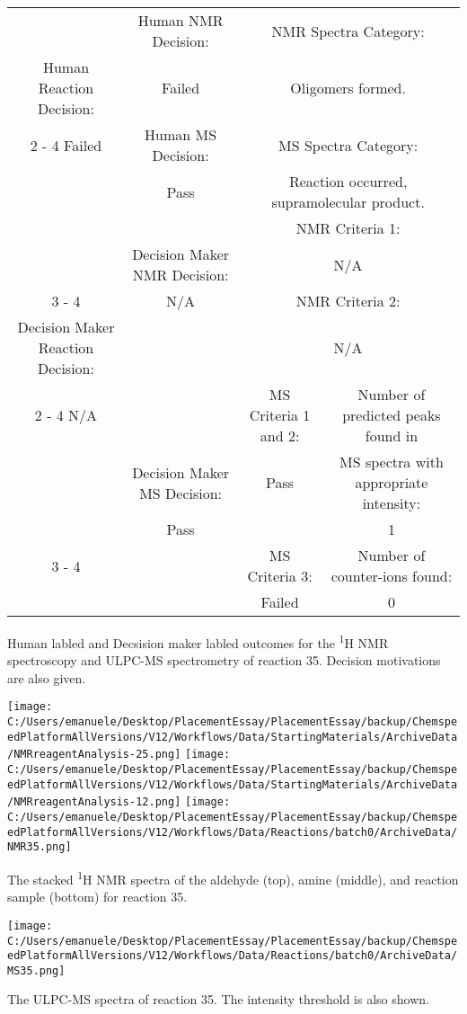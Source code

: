 \documentclass{article}%
\begin{document}
\begin{Decision Table}[H]%
\begin{tabular}{|c|c|c|c|}%
\hline%
&Human NMR Decision:&\multicolumn{2}{|c|}{NMR Spectra Category:}\\%
Human Reaction Decision:&Failed&\multicolumn{2}{|c|}{Oligomers formed.}\\%
\cline{2%
-%
4}%
Failed&Human MS Decision:&\multicolumn{2}{|c|}{MS Spectra Category:}\\%
&Pass&\multicolumn{2}{|c|}{Reaction occurred, supramolecular product.}\\%
\hline%
&&\multicolumn{2}{|c|}{NMR Criteria 1:}\\%
&Decision Maker NMR Decision:&\multicolumn{2}{|c|}{N/A}\\%
\cline{3%
-%
4}%
&N/A&\multicolumn{2}{|c|}{NMR Criteria 2:}\\%
Decision Maker Reaction Decision:&&\multicolumn{2}{|c|}{N/A}\\%
\cline{2%
-%
4}%
N/A&&MS Criteria 1 and 2:&Number of predicted peaks found in\\%
&Decision Maker MS Decision:&Pass&MS spectra with appropriate intensity:\\%
&Pass&&1\\%
\cline{3%
-%
4}%
&&MS Criteria 3:&Number of counter{-}ions found:\\%
&&Failed&0\\%
\hline%
\end{tabular}%
\caption{Human labled and Decsision maker labled outcomes for the \textsuperscript{1}H NMR spectroscopy and ULPC-MS spectrometry of reaction 35. Decision motivations are also given.}%
\end{Decision Table}%
\begin{NMR Spectra}[H]%
\begin{center}%
\texttt{[image: C:/Users/emanuele/Desktop/PlacementEssay/PlacementEssay/backup/ChemspeedPlatformAllVersions/V12/Workflows/Data/StartingMaterials/ArchiveData/NMRreagentAnalysis-25.png]}\hfill%
\texttt{[image: C:/Users/emanuele/Desktop/PlacementEssay/PlacementEssay/backup/ChemspeedPlatformAllVersions/V12/Workflows/Data/StartingMaterials/ArchiveData/NMRreagentAnalysis-12.png]}\hfill%
\texttt{[image: C:/Users/emanuele/Desktop/PlacementEssay/PlacementEssay/backup/ChemspeedPlatformAllVersions/V12/Workflows/Data/Reactions/batch0/ArchiveData/NMR35.png]}\hfill%
\end{center}%
\caption{The stacked \textsuperscript{1}H NMR spectra of the aldehyde (top), amine (middle), and reaction sample (bottom) for reaction 35.}%
\end{NMR Spectra}%
\begin{MS Spectra}[H]%
\begin{center}%
\texttt{[image: C:/Users/emanuele/Desktop/PlacementEssay/PlacementEssay/backup/ChemspeedPlatformAllVersions/V12/Workflows/Data/Reactions/batch0/ArchiveData/MS35.png]}\hfill%
\end{center}%
\caption{The ULPC-MS spectra of reaction 35. The intensity threshold is also shown.}%
\end{MS Spectra}%
\end{document}
